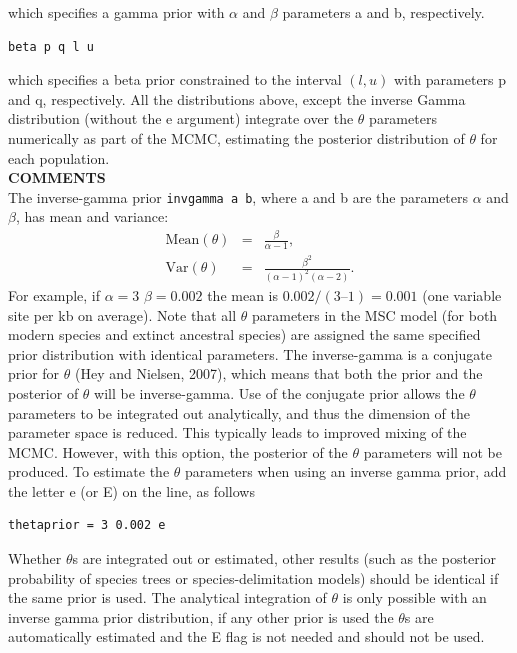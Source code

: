\documentclass[a4paper]{book}
\numberwithin{equation}{section} \renewcommand{\baselinestretch}{0.55}
\begin{document}
which specifies a gamma prior with $\alpha$ and $\beta$ parameters a and b, respectively.
\begin{verbatim}
beta p q l u
\end{verbatim}
which specifies a beta prior constrained to the interval $(l,u)$ with parameters p and q, respectively.
All the distributions above, except the inverse Gamma distribution (without the e argument) integrate over the $\theta$
parameters numerically as part of the MCMC, estimating the posterior
distribution of $\theta$ for each population.
\vspace{5pt}\\
\textbf{COMMENTS} \vspace{5pt}\\
The inverse-gamma prior \texttt{invgamma a b}, where a and b are the parameters $\alpha$ and $\beta$,
has mean and variance:
\begin{eqnarray}
  \textrm{Mean}(\theta) & = & \frac{\beta}{\alpha - 1}, \nonumber \\
    \textrm{Var}(\theta) & = & \frac{\beta^2}{(\alpha - 1)^2 (\alpha - 2)}. \nonumber
\end{eqnarray}
For example, if
$\alpha=3$ $\beta=0.002$ the mean is $0.002/(3 – 1) = 0.001$ (one
variable site per kb on average).  Note that all $\theta$ parameters
in the MSC model (for both modern species and extinct ancestral
species) are assigned the same specified prior distribution with identical
parameters.  The inverse-gamma is a conjugate prior for $\theta$ (Hey
and Nielsen, 2007), which means that both the prior and the posterior
of $\theta$ will be inverse-gamma.  Use of the conjugate prior allows
the $\theta$ parameters to be integrated out analytically, and thus
the dimension of the parameter space is reduced.  This typically leads
to improved mixing of the MCMC.  However, with this option, the
posterior of the $\theta$ parameters will not be produced.  To
estimate the $\theta$ parameters when using an inverse gamma prior,
add the letter e (or E) on the line, as follows
\begin{verbatim}
thetaprior = 3 0.002 e
\end{verbatim}
Whether $\theta$s are integrated out or estimated, other results (such as the posterior 
probability of species trees or species-delimitation models) should be identical
if the same prior is used. The analytical integration of $\theta$ is only possible
with an inverse gamma prior distribution, if any other prior is used
the $\theta$s are automatically estimated and the E flag is not needed and should not be used.
\end{document}
